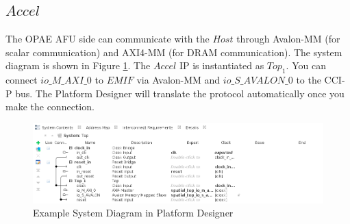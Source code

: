 \documentclass{article}
\begin{document}
    \subsection{$Accel$}
    The OPAE AFU side can communicate with the $Host$ through Avalon-MM (for scalar communication) and 
    AXI4-MM (for DRAM communication).
    The system diagram is shown in Figure \ref{fig:sys}.
    The $Accel$ IP is instantiated as $Top_1$.
    You can connect $io\_M\_AXI\_0$ to $EMIF$ via Avalon-MM and $io\_S\_AVALON\_0$ to the CCI-P bus. 
    The Platform Designer will translate the protocol automatically once you make the connection.
    
    \begin{figure}
    \centering
    \includegraphics[scale=0.45]{accel.png}
    \caption{Example System Diagram in Platform Designer}
    \label{fig:sys}
    \end{figure}
    
    
\end{document}
